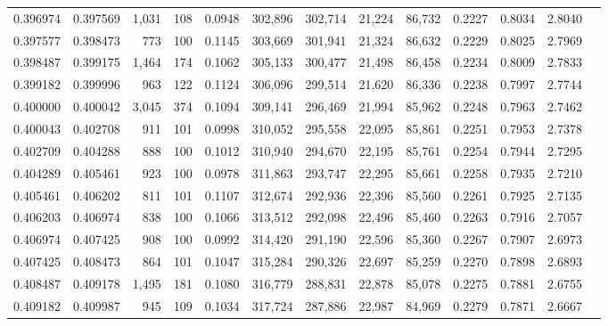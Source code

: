 \begin{tabular}{rrrrrrrrrrrrr}
0.396974 & 0.397569 & 1,031 & 108 &                                     0.0948 & 302,896 & 302,714 &  21,224 &  86,732 & 0.2227 & 0.8034 & 2.8040 \\
0.397577 & 0.398473 &   773 & 100 &                                     0.1145 & 303,669 & 301,941 &  21,324 &  86,632 & 0.2229 & 0.8025 & 2.7969 \\
0.398487 & 0.399175 & 1,464 & 174 &                                     0.1062 & 305,133 & 300,477 &  21,498 &  86,458 & 0.2234 & 0.8009 & 2.7833 \\
0.399182 & 0.399996 &   963 & 122 &                                     0.1124 & 306,096 & 299,514 &  21,620 &  86,336 & 0.2238 & 0.7997 & 2.7744 \\
0.400000 & 0.400042 & 3,045 & 374 &                                     0.1094 & 309,141 & 296,469 &  21,994 &  85,962 & 0.2248 & 0.7963 & 2.7462 \\
0.400043 & 0.402708 &   911 & 101 &                                     0.0998 & 310,052 & 295,558 &  22,095 &  85,861 & 0.2251 & 0.7953 & 2.7378 \\
0.402709 & 0.404288 &   888 & 100 &                                     0.1012 & 310,940 & 294,670 &  22,195 &  85,761 & 0.2254 & 0.7944 & 2.7295 \\
0.404289 & 0.405461 &   923 & 100 &                                     0.0978 & 311,863 & 293,747 &  22,295 &  85,661 & 0.2258 & 0.7935 & 2.7210 \\
0.405461 & 0.406202 &   811 & 101 &                                     0.1107 & 312,674 & 292,936 &  22,396 &  85,560 & 0.2261 & 0.7925 & 2.7135 \\
0.406203 & 0.406974 &   838 & 100 &                                     0.1066 & 313,512 & 292,098 &  22,496 &  85,460 & 0.2263 & 0.7916 & 2.7057 \\
0.406974 & 0.407425 &   908 & 100 &                                     0.0992 & 314,420 & 291,190 &  22,596 &  85,360 & 0.2267 & 0.7907 & 2.6973 \\
0.407425 & 0.408473 &   864 & 101 &                                     0.1047 & 315,284 & 290,326 &  22,697 &  85,259 & 0.2270 & 0.7898 & 2.6893 \\
0.408487 & 0.409178 & 1,495 & 181 &                                     0.1080 & 316,779 & 288,831 &  22,878 &  85,078 & 0.2275 & 0.7881 & 2.6755 \\
0.409182 & 0.409987 &   945 & 109 &                                     0.1034 & 317,724 & 287,886 &  22,987 &  84,969 & 0.2279 & 0.7871 & 2.6667 \\

\end{tabular}
